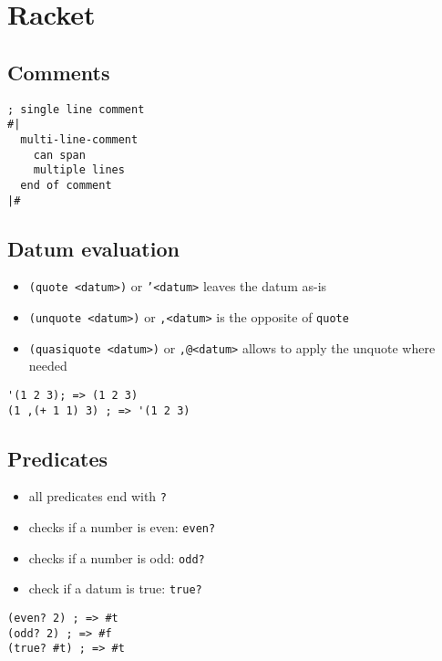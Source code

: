 \documentclass[a4paper,landscape,10pt]{article}
\begin{document}
\section{Racket}
\begin{multicols*}{2}
  \subsection{Comments}

  \begin{lstlisting}[language=Racket]
; single line comment
#|
  multi-line-comment
	can span
	multiple lines
  end of comment
|#
\end{lstlisting}

  \subsection{Datum evaluation}

  \begin{itemize}
    \item \lstinline[language=Racket]!(quote <datum>)! or \texttt{'<datum>} leaves the datum as-is
    \item \texttt{(unquote <datum>)} or \texttt{,<datum>} is the opposite of \texttt{quote}
    \item \texttt{(quasiquote <datum>)} or \texttt{,@<datum>} allows to apply the unquote where needed
  \end{itemize}

  \begin{lstlisting}[language=Racket]
'(1 2 3); => (1 2 3)
(1 ,(+ 1 1) 3) ; => '(1 2 3)
\end{lstlisting}

  \subsection{Predicates}

  \begin{itemize}
    \item all predicates end with \texttt{?}
    \item checks if a number is even: \texttt{even?}
    \item checks if a number is odd: \texttt{odd?}
    \item check if a datum is true: \texttt{true?}
  \end{itemize}

  \begin{lstlisting}[language=Racket]
(even? 2) ; => #t
(odd? 2) ; => #f
(true? #t) ; => #t
\end{lstlisting}


\end{multicols*}
\end{document}
